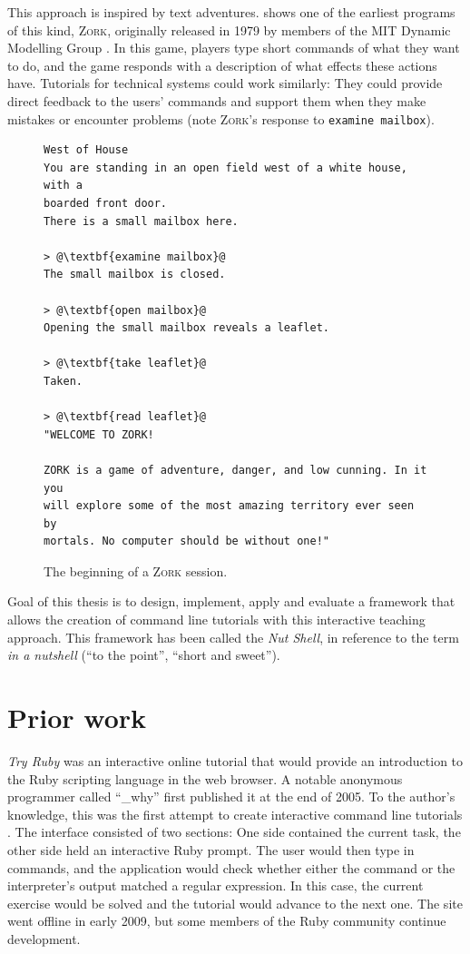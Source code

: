 \documentclass[paper=a4,abstract=on,cleardoublepage=empty,numbers=noenddot,toc=bib,12pt,appendixprefix=true]{scrreprt}
\begin{document}
This approach is inspired by text adventures.  shows one of the earliest programs of this kind, \textsc{Zork}, originally released in 1979 by members of the MIT Dynamic Modelling Group \cite{infocom}. In this game, players type short commands of what they want to do, and the game responds with a description of what effects these actions have. Tutorials for technical systems could work similarly: They could provide direct feedback to the users' commands and support them when they make mistakes or encounter problems (note \textsc{Zork}'s response to \texttt{examine mailbox}).

\begin{figure}[tb]
    \begin{lstlisting}[escapechar=@,frame=shadowbox]
West of House
You are standing in an open field west of a white house, with a
boarded front door.
There is a small mailbox here.

> @\textbf{examine mailbox}@
The small mailbox is closed.

> @\textbf{open mailbox}@
Opening the small mailbox reveals a leaflet.

> @\textbf{take leaflet}@
Taken.

> @\textbf{read leaflet}@
"WELCOME TO ZORK!

ZORK is a game of adventure, danger, and low cunning. In it you
will explore some of the most amazing territory ever seen by
mortals. No computer should be without one!"
    \end{lstlisting}
    \centering
    \caption{The beginning of a \textsc{Zork} session.}
    \label{fig:zork}
\end{figure}

Goal of this thesis is to design, implement, apply and evaluate a framework that allows the creation of command line tutorials with this interactive teaching approach. This framework has been called the \emph{Nut Shell}, in reference to the term \emph{in a nutshell} (“to the point”, “short and sweet”).

\section{Prior work}

\emph{Try Ruby} was an interactive online tutorial that would provide an introduction to the Ruby scripting language in the web browser. A notable anonymous programmer called “\_why” first published it at the end of 2005. To the author's knowledge, this was the first attempt to create interactive command line tutorials \cite{why05}. The interface consisted of two sections: One side contained the current task, the other side held an interactive Ruby prompt. The user would then type in commands, and the application would check whether either the command or the interpreter's output matched a regular expression. In this case, the current exercise would be solved and the tutorial would advance to the next one.
The site went offline in early 2009, but some members of the Ruby community continue development.
\end{document}
